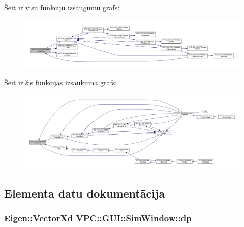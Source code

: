 Šeit ir visu funkciju izsaugumu grafs\+:
\nopagebreak
\begin{figure}[H]
\begin{center}
\leavevmode
\includegraphics[width=350pt]{class_v_p_c_1_1_g_u_i_1_1_g_l_u_t_window_a3dd7ed12ee68dea02946415292139a0e_cgraph}
\end{center}
\end{figure}




Šeit ir šīs funkcijas izsaukuma grafs\+:
\nopagebreak
\begin{figure}[H]
\begin{center}
\leavevmode
\includegraphics[width=350pt]{class_v_p_c_1_1_g_u_i_1_1_g_l_u_t_window_a3dd7ed12ee68dea02946415292139a0e_icgraph}
\end{center}
\end{figure}




\subsection{Elementa datu dokumentācija}
\subsubsection[{\texorpdfstring{dp}{dp}}]{\setlength{\rightskip}{0pt plus 5cm}Eigen\+::\+Vector\+Xd V\+P\+C\+::\+G\+U\+I\+::\+Sim\+Window\+::dp}\hypertarget{class_v_p_c_1_1_g_u_i_1_1_sim_window_a144f2ee38a2a5e72b3b7d9d2505bd23e}{}\label{class_v_p_c_1_1_g_u_i_1_1_sim_window_a144f2ee38a2a5e72b3b7d9d2505bd23e}



